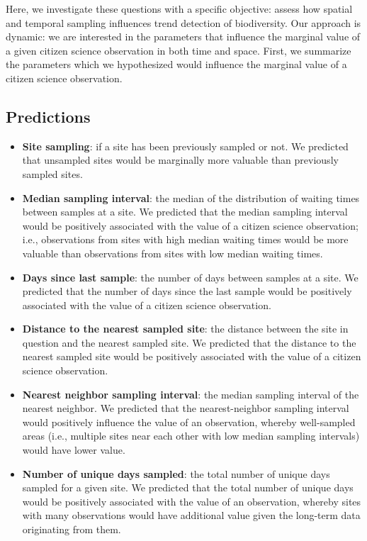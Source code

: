 \documentclass[9pt,twocolumn,twoside,lineno]{pnas-new}
\begin{document}
Here, we investigate these questions with a specific objective: assess how spatial and temporal sampling influences trend detection of biodiversity. Our approach is dynamic: we are interested in the parameters that influence the marginal value of a given citizen science observation in both time and space. First, we summarize the parameters which we hypothesized would influence the marginal value of a citizen science observation.

\subsection*{Predictions}

\begin{itemize}
  \item \textbf{Site sampling}: if a site has been previously sampled or not. We predicted that unsampled sites would be marginally more valuable than previously sampled sites.
  \item \textbf{Median sampling interval}: the median of the distribution of waiting times between samples at a site. We predicted that the median sampling interval would be positively associated with the value of a citizen science observation; i.e., observations from sites with high median waiting times would be more valuable than observations from sites with low median waiting times.
  \item \textbf{Days since last sample}: the number of days between samples at a site. We predicted that the number of days since the last sample would be positively associated with the value of a citizen science observation.
  \item \textbf{Distance to the nearest sampled site}: the distance between the site in question and the nearest sampled site. We predicted that the distance to the nearest sampled site would be positively associated with the value of a citizen science observation.
  \item \textbf{Nearest neighbor sampling interval}: the median sampling interval of the nearest neighbor. We predicted that the nearest-neighbor sampling interval would positively influence the value of an observation, whereby well-sampled areas (i.e., multiple sites near each other with low median sampling intervals) would have lower value.
  \item \textbf{Number of unique days sampled}: the total number of unique days sampled for a given site. We predicted that the total number of unique days would be positively associated with the value of an observation, whereby sites with many observations would have additional value given the long-term data originating from them.
\end{itemize}
\end{document}
